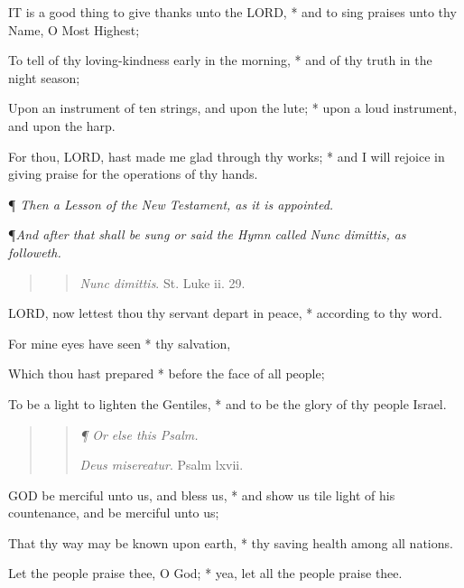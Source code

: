 IT
is a good thing to give thanks unto the LORD, *
and to sing praises unto thy Name, O Most Highest;

To tell of thy loving-kindness early in the morning,
* and of thy truth in the night season;

Upon an instrument of ten strings, and upon the lute;
* upon a loud instrument, and upon the harp.

For thou, LORD, hast made me
glad through thy works; * and I will rejoice in giving praise for the
operations of thy hands.

¶
\emph{Then a Lesson of the New Testament, as it is appointed.}

¶\emph{And after that shall be sung or said the Hymn called Nunc dimittis, as
followeth.}

\begin{quote}

\begin{quote}

\emph{Nunc
dimittis}. St. Luke ii. 29.

\end{quote}

\end{quote}

LORD,
now lettest thou thy servant depart in peace, * according to thy word.

For mine eyes have seen * thy salvation, 

Which thou hast prepared * before the face of all people;

To be a light to lighten the Gentiles, * and to be
the glory of thy people Israel.

\begin{quote}

\begin{quote}

\emph{¶
Or else this Psalm.}

\emph{Deus
misereatur}. Psalm lxvii.

\end{quote}

\end{quote}

GOD
be merciful unto us, and bless us, * and show us tile light of his countenance,
and be merciful unto us;

That thy way may be known upon earth, * thy saving
health among all nations.

Let the people praise thee, O God; * yea, let all the
people praise thee.

